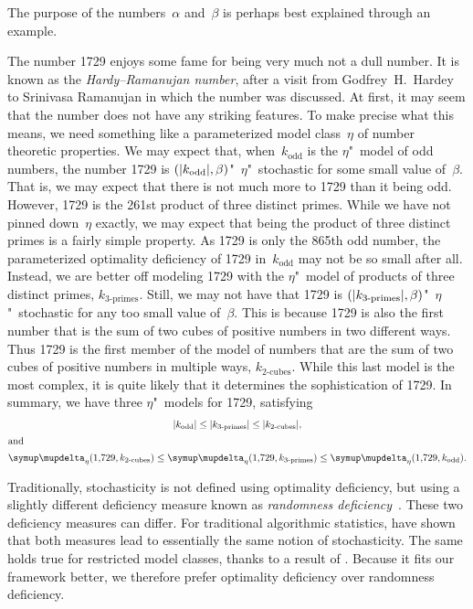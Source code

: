The purpose of the numbers~$\alpha$ and~$\beta$ is perhaps best explained through an example.
\begin{example}
  The number \num{1729} enjoys some fame for being very much not a dull number.
  It is known as the \emph{Hardy--Ramanujan number}, after a visit from Godfrey~H.~Hardey to Srinivasa Ramanujan in which the number was discussed.
  At first, it may seem that the number does not have any striking features.
  To make precise what this means, we need something like a parameterized model class~$\eta$ of number theoretic properties.
  We may expect that, when~$k_\text{odd}$ is the $\eta$"~model of odd numbers, the number \num{1729} is $({\lvert k_\text{odd}\rvert}, \beta)$"~$\eta$"~stochastic for some small value of~$\beta$.
  That is, we may expect that there is not much more to \num{1729} than it being odd.
  However, \num{1729} is the \num{261}st product of three distinct primes.
  While we have not pinned down~$\eta$ exactly, we may expect that being the product of three distinct primes is a fairly simple property.
  As \num{1729} is only the \num{865}th odd number, the parameterized optimality deficiency of \num{1729} in~$k_\text{odd}$ may not be so small after all.
  Instead, we are better off modeling \num{1729} with the $\eta$"~model of products of three distinct primes, $k_{3\text{-primes}}$.
  Still, we may not have that \num{1729} is $({\lvert k_{3\text{-primes}}\rvert}, \beta)$"~$\eta$"~stochastic for any too small value of~$\beta$.
  This is because \num{1729} is also the first number that is the sum of two cubes of positive numbers in two different ways.
  Thus \num{1729} is the first member of the model of numbers that are the sum of two cubes of positive numbers in multiple ways, $k_{2\text{-cubes}}$.
  While this last model is the most complex, it is quite likely that it determines the sophistication of \num{1729}.
  In summary, we have three $\eta$"~models for \num{1729}, satisfying
  \begin{gather*}
    \length{k_\text{odd}} \le \length{k_{3\text{-primes}}} \le \length{k_{2\text{-cubes}}}, \\
  \shortintertext{and}
    \updelta_\eta(\num{1729}, k_{2\text{-cubes}}) \le \updelta_\eta(\num{1729}, k_{3\text{-primes}}) \le \updelta_\eta(\num{1729}, k_\text{odd}).
  \end{gather*}
\end{example}

Traditionally, stochasticity is not defined using optimality deficiency, but using a slightly different deficiency measure known as \emph{randomness deficiency}~\parencite{shen1983concept,li2008introduction}.
These two deficiency measures can differ.
For traditional algorithmic statistics, \textcite[Theorem~2]{vereshchagin2017algorithmic} have shown that both measures lead to essentially the same notion of stochasticity.
The same holds true for restricted model classes, thanks to a result of \textcite{vereshchagin2010rate} \parencite[see also][]{vereshchagin2017algorithmic}.
Because it fits our framework better, we therefore prefer optimality deficiency over randomness deficiency.

